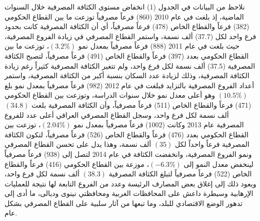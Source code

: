 \documentclass[10pt,a4paper]{report}
\begin{document}
\begin{doublespacing}
نلاحظ من البيانات في الجدول (1) انخفاض مستوى الكثافة المصرفية خلال السنوات الماضية، إذ بلغت في عام 2010 (860) فرعاً مصرفياً توزعت ما بين القطاع الحكومي (382) فرعاً والقطاع الخاص (478) فرعاً مصرفياً، أي أن الكثافة المصرفية كانت بحدود فرع واحد لكل ($37.7$) ألف نسمة، واستمر القطاع المصرفي في زيادة الفروع المصرفية، حيث بلغت في عام 2011 (888) فرعاً مصرفياً بمعدل نمو \((3.2\%)\)، توزعت ما بين القطاع الحكومي بعدد (397) فرعاً والقطاع الخاص (491) فرعاً مصرفياً، لتصبح الكثافة المصرفية (37.5) ألف نسمة لكل فرع واحد، ولم تتغير الكثافة المصرفية كثيراً رغم زيادة الكثافة المصرفية، وذلك لزيادة عدد السكان بنسبة أكبر من الكثافة المصرفية، واستمر أعداد الفروع المصرفية بالتزايد فبلغت في عام 2012 (982) فرعاً مصرفياً بمعدل نمو بلغ \((10.5\%)\) وهو أعلى معدل نمو خلال سنوات الدراسة، وتوزعت بين القطاع الحكومي (471) فرعاً والقطاع الخاص (511) فرعاً مصرفياً، وأن الكثافة المصرفية بلغت \((34.8)\) ألف نسمة لكل فرع واحد، وسجل القطاع المصرفي العراقي أعلى عدد للفروع المصرفية عام 2013 وكانت (1002) فرعاً مصرفياً بمعدل نمو \((2.04\%)\)، توزعت بين القطاع الحكومي بعدد (476) فرعاً والقطاع الخاص (526) فرعاً مصرفياً، لتكون الكثافة المصرفية فرعاً واحداً لكل \((35)\) ألف نسمة، وهذا يدل على تحسن القطاع المصرفي ونمو الفروع المصرفية، وانخفضت الكثافة في عام 2014 لتصل إلى (938) فرعاً مصرفياً لينخفض معدل النمو إلى \((-6.3\%)\)، موزعة بين القطاع الحكومي (416) فرعاً والقطاع الخاص (522) فرعاً مصرفياً لتبلغ الكثافة المصرفية \((38.3)\) ألف نسمة لكل فرع واحد، ويعود ذلك إلى إغلاق بعض المصارف الرئيسة وعدد من الفروع التابعة لها نتيجة للعمليات الإرهابية وسيطرة داعش على المحافظات الغربية ومحافظتي نينوى وديالى، ما أدى إلى تدهور الوضع الاقتصادي للبلد، وما تبعها من آثار سلبية على القطاع المصرفي بشكل عام.


\end{doublespacing}
\end{document}
